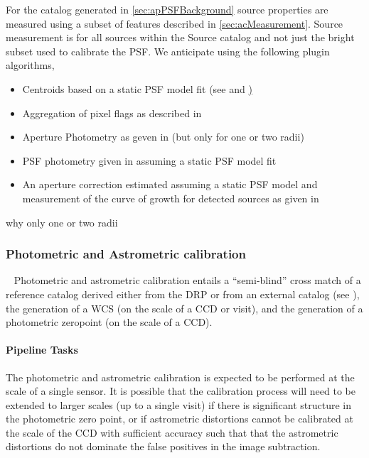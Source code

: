 For the \Source catalog generated in \ref{sec:apPSFBackground} source properties are measured using a subset of features described in \ref{sec:acMeasurement}. Source measurement is for all sources within the Source catalog and not just the bright subset used to calibrate the PSF.  We anticipate using the following plugin algorithms,
\begin{itemize}
\item Centroids based on a static PSF model fit (see \hyperref[sec:acCentroidAlgorithms]{} and \hyperref[sec:acStaticPointSourceModels])
\item Aggregation of pixel flags as described in \hyperref[sec:acPixelFlags]{}
\item Aperture Photometry as geven in \hyperref[sec:acAperturePhotometry]{} (but only for one or two radii) 
\item PSF photometry given in \hyperref[sec:acPSFPhotometry]{} assuming a static PSF model fit
\item  An aperture correction estimated assuming a static PSF model and measurement of the curve of growth for  detected sources as given in \hyperref[sec:apertureCorrection]{}
\end{itemize}

\begin{note} why only one or two radii \end{note}


\subsubsection{Photometric and Astrometric calibration}~ 
Photometric and astrometric calibration entails a ``semi-blind'' cross match of a reference catalog derived either from the DRP \Objects or from an external catalog (see \hyperref[sec:apSFMInput]{}), the generation of a WCS (on the scale of a CCD or visit), and the generation of a photometric zeropoint (on the scale of a CCD).

\paragraph{Pipeline Tasks}
The photometric and astrometric calibration is expected to be performed at the scale of a single sensor. It is possible that the calibration process will need to be extended to larger scales (up to a single visit) if there is significant structure in the photometric zero point, or if astrometric distortions cannot be calibrated at the scale of the CCD with sufficient accuracy such that that the astrometric distortions do not dominate the false positives in the image subtraction.

